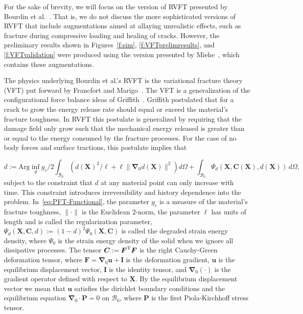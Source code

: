 \documentclass[10pt,letterpaper]{article}
\newcommand{\bs}[1]{\ensuremath{\boldsymbol{#1}}}
\begin{document}
    For the sake of brevity,  we will focus on the version of RVFT presented by Bourdin et al.~\cite{bourdin2000numerical, bourdin_2008}.  That is, we do not discuss the more sophisticated versions of RVFT that include augmentations aimed at allaying unrealistic effects, such as fracture during compressive loading and healing of cracks. However, the  preliminary results shown in Figures~\ref{f:sim}, \ref{f:VFTprelimresults}, and \ref{f:VFTvalidation} were produced using the version presented by Miehe~\cite{miehe2010phase}, which contains these augmentations.

    The physics underlying Bourdin et al.'s RVFT is the variational fracture theory (VFT) put forward by Francfort and Marigo~\cite{francfort_1998}. The VFT is a generalization of the configurational force balance ideas of  Griffith~\cite{griffith1921phenomena}. Griffith postulated that for a crack to grow the energy release rate should equal or exceed the material's fracture toughness. In RVFT this postulate is generalized by requiring that the damage field only grow such that the  mechanical energy released is greater than or equal to the energy consumed by the fracture processes.  For the case of no body forces and surface tractions, this postulate implies that

    \begin{equation}
      \label{eq:PFT-Functional}
      d:=\mathrm{Arg}\inf_d
      g_c/2
      \int_{\mathcal{B}_0}
      \left(
      d(\bs{X})^2/\ell + \ell \lVert\bs{\nabla}_0d(\bs{X})\rVert^2
      \right)
      d\Omega
      +\int_{\mathcal{B}_0}
      \Psi_{d}(\mathbf{X},\bs{C}(\bs{X}), d(\bs{X}))
      \, d\Omega,
    \end{equation}
    subject to the constraint that $d$ at any material point can only increase with time. This constraint introduces irreversibility and history dependence into the problem. In~\eqref{eq:PFT-Functional}, the parameter $g_c$ is a measure of the  material's fracture toughness,  $\|\cdot\|$ is the Euclidean 2-norm, the parameter $\ell$ has units of length and is called the regularization parameter, $\Psi_{d}(\mathbf{X},\bs{C}, d):=(1-d)^2 \Psi_{0}(\bs{X}, \bs{C})$ is called the degraded strain energy density,  where  $\Psi_0$ is the strain energy density of the solid when we ignore all dissipative processes. The tensor $\bs{C}:=\bs{F}^{\rm T}\bs{F}$ is the right Cauchy-Green deformation tensor, where $\bs{F}=\bs{\nabla}_{0}\bs{u}+\bs{I}$ is the deformation gradient, $\bs{u}$ is the equilibrium displacement vector, $\bs{I}$ is the identity tensor, and $\bs{\nabla}_0(\cdot)$ is the gradient operator defined with respect to $\bs{X}$.  By the  equilibrium displacement vector we mean that $\bs{u}$ satisfies the dirichlet boundary conditions and the equilibrium equation $\bs{\nabla}_0\cdot\bs{P}=0$ on $\mathcal{B}_0$, where $\bs{P}$ is the first Piola-Kirchhoff stress tensor.
\end{document}
